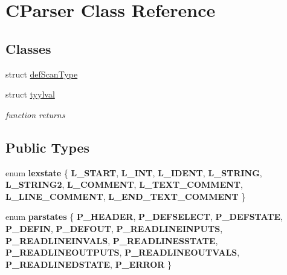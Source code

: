 \hypertarget{class_c_parser}{}\section{C\+Parser Class Reference}
\label{class_c_parser}
\subsection*{Classes}
\begin{DoxyCompactItemize}
\item 
struct \mbox{\hyperlink{struct_c_parser_1_1def_scan_type}{def\+Scan\+Type}}
\item 
struct \mbox{\hyperlink{struct_c_parser_1_1tyylval}{tyylval}}
\begin{DoxyCompactList}\small\item\em function returns \end{DoxyCompactList}\end{DoxyCompactItemize}
\subsection*{Public Types}
\begin{DoxyCompactItemize}
\item 
\mbox{\label{class_c_parser_a0f232c75c4c71d5cb66542b821d5ec2b}} 
enum {\bfseries lexstate} \{ \newline
{\bfseries L\+\_\+\+S\+T\+A\+RT}, 
{\bfseries L\+\_\+\+I\+NT}, 
{\bfseries L\+\_\+\+I\+D\+E\+NT}, 
{\bfseries L\+\_\+\+S\+T\+R\+I\+NG}, 
\newline
{\bfseries L\+\_\+\+S\+T\+R\+I\+N\+G2}, 
{\bfseries L\+\_\+\+C\+O\+M\+M\+E\+NT}, 
{\bfseries L\+\_\+\+T\+E\+X\+T\+\_\+\+C\+O\+M\+M\+E\+NT}, 
{\bfseries L\+\_\+\+L\+I\+N\+E\+\_\+\+C\+O\+M\+M\+E\+NT}, 
\newline
{\bfseries L\+\_\+\+E\+N\+D\+\_\+\+T\+E\+X\+T\+\_\+\+C\+O\+M\+M\+E\+NT}
 \}
\item 
\mbox{\label{class_c_parser_a39e47a64ff983ee093aad6e5b8e73674}} 
enum {\bfseries parstates} \{ \newline
{\bfseries P\+\_\+\+H\+E\+A\+D\+ER}, 
{\bfseries P\+\_\+\+D\+E\+F\+S\+E\+L\+E\+CT}, 
{\bfseries P\+\_\+\+D\+E\+F\+S\+T\+A\+TE}, 
{\bfseries P\+\_\+\+D\+E\+F\+IN}, 
\newline
{\bfseries P\+\_\+\+D\+E\+F\+O\+UT}, 
{\bfseries P\+\_\+\+R\+E\+A\+D\+L\+I\+N\+E\+I\+N\+P\+U\+TS}, 
{\bfseries P\+\_\+\+R\+E\+A\+D\+L\+I\+N\+E\+I\+N\+V\+A\+LS}, 
{\bfseries P\+\_\+\+R\+E\+A\+D\+L\+I\+N\+E\+S\+S\+T\+A\+TE}, 
\newline
{\bfseries P\+\_\+\+R\+E\+A\+D\+L\+I\+N\+E\+O\+U\+T\+P\+U\+TS}, 
{\bfseries P\+\_\+\+R\+E\+A\+D\+L\+I\+N\+E\+O\+U\+T\+V\+A\+LS}, 
{\bfseries P\+\_\+\+R\+E\+A\+D\+L\+I\+N\+E\+D\+S\+T\+A\+TE}, 
{\bfseries P\+\_\+\+E\+R\+R\+OR}
 \}
\end{DoxyCompactItemize}
